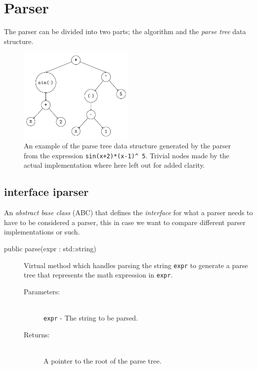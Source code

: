 \documentclass[a4paper,11pt]{kth-mag}
\begin{document}
\section{Parser}
The parser can be divided into two parts; the algorithm and the \emph{parse
tree} data structure. 

\begin{figure}[H]
\begin{center}
    \includegraphics[width=0.5\textwidth]{parse-tree.pdf}
    \caption{\small{
        An example of the parse tree data structure generated by the parser
        from the expression \texttt{sin(x+2)*(x-1)}\texttt{\^~}\!\!\texttt{5}.
        Trivial nodes made by the actual implementation where
        here left out for added clarity.
    }}
   \label{fig:parsetree}
\end{center}
\end{figure}

\subsection{interface iparser}
An \emph{abstract base class} (ABC) that defines the \emph{interface} for what a parser 
needs to have to be considered a parser, this in case we want to compare 
different parser implementations or such.
\begin{description}
    \item[public parse(expr : std::string)] Virtual method which handles
    parsing the string \texttt{expr} to generate a parse tree that 
    represents the math expression in \texttt{expr}.
    \begin{description}
        \item[Parameters:]~\\
            \verb+expr+ - The string to be parsed.
        \item[Returns:]~\\
            A pointer to the root of the parse tree.
    \end{description}
\end{description}
\end{document}
